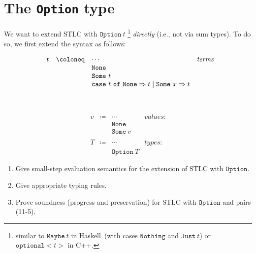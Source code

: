 \section{The \texttt{Option} type}
We want to extend STLC with $\mathtt{Option}\ t$
\footnote{similar to $\mathtt{Maybe}\ t$ in Haskell~(with cases $\mathtt{Nothing}$ and $\mathtt{Just}\ t$) or $\mathtt{optional<}t\mathtt{>}$ in C++.
} \emph{directly} (i.e., not via sum types). To do so, we first extend the syntax as follows:\\
\begin{minipage}{\textwidth}
  \begin{minipage}{0.45\textwidth}
    \[
      \begin{array}{rclr}
        t &\coloneq& \cdots &\emph{terms} \\
        &&\mathtt{None}&\textit{} \\
        &&\mathtt{Some}~t&\textit{} \\
        &&\mathtt{case}~t~\mathtt{of}~\mathtt{None}\Rightarrow t\mid\mathtt{Some}~x\Rightarrow t \\
        \phantom{\quad}\\
        \phantom{\quad}\\
      \end{array}
    \]
  \end{minipage}
  \hfill
  \begin{minipage}{0.45\textwidth}
    \[
      \begin{array}{rclr}
        v &\coloneq& \cdots&\textit{values:} \\
        &&\mathtt{None}&\textit{} \\
        &&\mathtt{Some}~v&\textit{} \\
        \\
        T &\coloneq& \cdots&\textit{types:} \\
        &&\mathtt{Option}~T&\textit{}
      \end{array}
    \]
  \end{minipage}
  \hfill
  \vspace{1em}
\end{minipage}

\begin{enumerate}
  \item Give small-step evaluation semantics for the extension of STLC with $\mathtt{Option}$.
  \item Give appropriate typing rules.
  \item Prove soundness (progress and preservation) for STLC with $\mathtt{Option}$ and pairs (11-5).
\end{enumerate}

